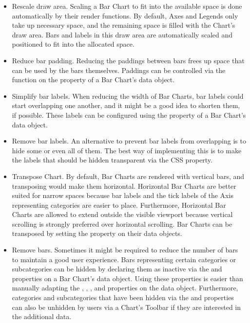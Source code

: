 \begin{itemize}

\item
Rescale draw area.
Scaling a Bar Chart to fit into the available space is done automatically by their render functions.
By default, Axes and Legends only take up necessary space, and the remaining space is filled with the Chart's draw area.
Bars and labels in this draw area are automatically scaled and positioned to fit into the allocated space.

\item
Reduce bar padding.
Reducing the paddings between bars frees up space that can be used by the bars themselves.
Paddings can be controlled via the  function on the  property of a Bar Chart's data object. 

\item
Simplify bar labels.
When reducing the width of Bar Charts, bar labels could start overlapping one another, and it might be a good idea to shorten them, if possible. 
These labels can be configured using the  property of a Bar Chart's data object.

\item
Remove bar labels.
An alternative to prevent bar labels from overlapping is to hide some or even all of them.
The best way of implementing this is to make the labels that should be hidden transparent via the CSS  property.

\item
Transpose Chart.
By default, Bar Charts are rendered with vertical bars, and transposing would make them horizontal.
Horizontal Bar Charts are better suited for narrow spaces because bar labels and the tick labels of the Axis representing categories are easier to place.
Furthermore, Horizontal Bar Charts are allowed to extend outside the visible viewport because vertical scrolling is strongly preferred over horizontal scrolling.
Bar Charts can be transposed by setting the  property on their data objects.

\item
Remove bars.
Sometimes it might be required to reduce the number of bars to maintain a good user experience.
Bars representing certain categories or subcategories can be hidden by declaring them as inactive via the  and  properties on a Bar Chart's data object.
Using these properties is easier than manually adapting the , , , and  properties on the data object.
Furthermore, categories and subcategories that have been hidden via the  and  properties can also be unhidden by users via a Chart's Toolbar if they are interested in the additional data.  


\end{itemize}
